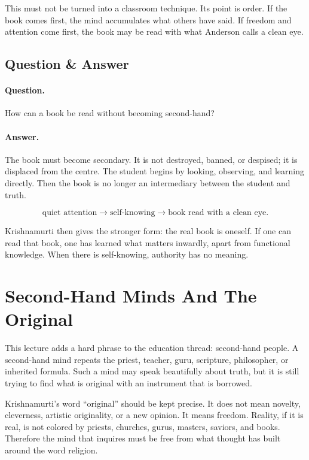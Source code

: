 \documentclass[11pt,oneside]{book}
\begin{document}
This must not be turned into a classroom technique. Its point is order. If the book comes first, the mind accumulates what others have said. If freedom and attention come first, the book may be read with what Anderson calls a clean eye.

\subsection{Question \& Answer}

\paragraph{Question.}
How can a book be read without becoming second-hand?

\paragraph{Answer.}
The book must become secondary. It is not destroyed, banned, or despised; it is displaced from the centre. The student begins by looking, observing, and learning directly. Then the book is no longer an intermediary between the student and truth.

\begin{equation}
\text{quiet attention}
\longrightarrow
\text{self-knowing}
\longrightarrow
\text{book read with a clean eye}.
\end{equation}

Krishnamurti then gives the stronger form: the real book is oneself. If one can read that book, one has learned what matters inwardly, apart from functional knowledge. When there is self-knowing, authority has no meaning.

\section{Second-Hand Minds And The Original}

This lecture adds a hard phrase to the education thread: second-hand people. A second-hand mind repeats the priest, teacher, guru, scripture, philosopher, or inherited formula. Such a mind may speak beautifully about truth, but it is still trying to find what is original with an instrument that is borrowed.

Krishnamurti's word ``original'' should be kept precise. It does not mean novelty, cleverness, artistic originality, or a new opinion. It means freedom. Reality, if it is real, is not colored by priests, churches, gurus, masters, saviors, and books. Therefore the mind that inquires must be free from what thought has built around the word religion.
\end{document}
